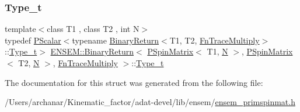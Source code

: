 \subsubsection{\texorpdfstring{Type\_t}{Type\_t}\hspace{0.1cm}{\footnotesize\ttfamily [3/3]}}
{\footnotesize\ttfamily template$<$class T1 , class T2 , int N$>$ \\
typedef \mbox{\hyperlink{classENSEM_1_1PScalar}{P\+Scalar}}$<$typename \mbox{\hyperlink{structENSEM_1_1BinaryReturn}{Binary\+Return}}$<$T1, T2, \mbox{\hyperlink{structENSEM_1_1FnTraceMultiply}{Fn\+Trace\+Multiply}}$>$\+::\mbox{\hyperlink{structENSEM_1_1BinaryReturn_3_01PSpinMatrix_3_01T1_00_01N_01_4_00_01PSpinMatrix_3_01T2_00_01N_01_4_00_01FnTraceMultiply_01_4_af60ffd7e2fcfd3d23cf60dbc97969238}{Type\+\_\+t}}$>$ \mbox{\hyperlink{structENSEM_1_1BinaryReturn}{E\+N\+S\+E\+M\+::\+Binary\+Return}}$<$ \mbox{\hyperlink{classENSEM_1_1PSpinMatrix}{P\+Spin\+Matrix}}$<$ T1, \mbox{\hyperlink{adat__devel_2lib_2hadron_2operator__name__util_8cc_a7722c8ecbb62d99aee7ce68b1752f337}{N}} $>$, \mbox{\hyperlink{classENSEM_1_1PSpinMatrix}{P\+Spin\+Matrix}}$<$ T2, \mbox{\hyperlink{adat__devel_2lib_2hadron_2operator__name__util_8cc_a7722c8ecbb62d99aee7ce68b1752f337}{N}} $>$, \mbox{\hyperlink{structENSEM_1_1FnTraceMultiply}{Fn\+Trace\+Multiply}} $>$\+::\mbox{\hyperlink{structENSEM_1_1BinaryReturn_3_01PSpinMatrix_3_01T1_00_01N_01_4_00_01PSpinMatrix_3_01T2_00_01N_01_4_00_01FnTraceMultiply_01_4_af60ffd7e2fcfd3d23cf60dbc97969238}{Type\+\_\+t}}}



The documentation for this struct was generated from the following file\+:\begin{DoxyCompactItemize}
\item 
/\+Users/archanar/\+Kinematic\+\_\+factor/adat-\/devel/lib/ensem/\mbox{\hyperlink{adat-devel_2lib_2ensem_2ensem__primspinmat_8h}{ensem\+\_\+primspinmat.\+h}}\end{DoxyCompactItemize}
